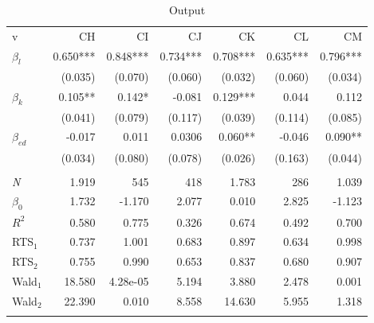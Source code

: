 \begin{table}[tb]
	\centering
	\caption{Output}
	\label{tab:Output2}
	\begin{tabular}{@{}lrrrrrr@{}}
		\arrayrulecolor{MidnightBlue}\toprule
		v            & CH       & CI       & CJ       & CK       & CL       & CM       \\ \arrayrulecolor{MidnightBlue}\midrule
		$\beta_l$    & 0.650*** & 0.848*** & 0.734*** & 0.708*** & 0.635*** & 0.796*** \\
		& (0.035)  & (0.070)  & (0.060)  & (0.032)  & (0.060)  & (0.034)  \\
		$\beta_k$    & 0.105**  & 0.142*   & -0.081   & 0.129*** & 0.044    & 0.112    \\
		& (0.041)  & (0.079)  & (0.117)  & (0.039)  & (0.114)  & (0.085)  \\
		$\beta_{ed}$ & -0.017   & 0.011    & 0.0306   & 0.060**  & -0.046   & 0.090**  \\
		& (0.034)  & (0.080)  & (0.078)  & (0.026)  & (0.163)  & (0.044)  \\
		&          &          &          &          &          &          \\
		\emph{N} & 1.919    & 545      & 418      & 1.783    & 286      & 1.039    \\
		$\beta_0$    & 1.732    & -1.170   & 2.077    & 0.010    & 2.825    & -1.123   \\
		$R^2$        & 0.580    & 0.775    & 0.326    & 0.674    & 0.492    & 0.700    \\
		RTS$_1$      & 0.737    & 1.001    & 0.683    & 0.897    & 0.634    & 0.998    \\
		RTS$_2$      & 0.755    & 0.990    & 0.653    & 0.837    & 0.680    & 0.907    \\
		Wald$_1$     & 18.580   & 4.28e-05 & 5.194    & 3.880    & 2.478    & 0.001    \\
		Wald$_2$     & 22.390   & 0.010    & 8.558    & 14.630   & 5.955    & 1.318   
		\\
		\arrayrulecolor{MidnightBlue}\bottomrule
	\end{tabular}
\end{table}